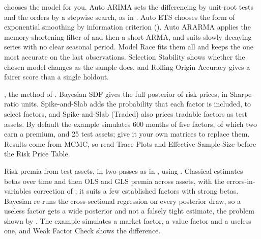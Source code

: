  chooses the model for you. Auto ARIMA sets the differencing by unit-root tests and the orders by a stepwise search, as in . Auto ETS chooses the form of exponential smoothing by information criterion (). Auto ARARMA applies the memory-shortening filter of  and then a short ARMA, and suits slowly decaying series with no clear seasonal period. Model Race fits them all and keeps the one most accurate on the last observations. Selection Stability shows whether the chosen model changes as the sample does, and Rolling-Origin Accuracy gives a fairer score than a single holdout.

, the method of . Bayesian SDF gives the full posterior of risk prices, in Sharpe-ratio units. Spike-and-Slab adds the probability that each factor is included, to select factors, and Spike-and-Slab (Traded) also prices tradable factors as test assets. By default the example simulates 600 months of five factors, of which two earn a premium, and 25 test assets; give it your own matrices to replace them. Results come from MCMC, so read Trace Plots and Effective Sample Size before the Risk Price Table.

Risk premia from test assets, in two passes as in , using . Classical estimates betas over time and then OLS and GLS premia across assets, with the errors-in-variables correction of ; it suits a few established factors with strong betas. Bayesian re-runs the cross-sectional regression on every posterior draw, so a useless factor gets a wide posterior and not a falsely tight estimate, the problem shown by . The example simulates a market factor, a value factor and a useless one, and Weak Factor Check shows the difference.

